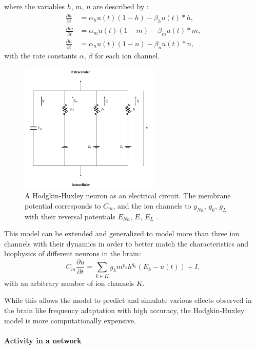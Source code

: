where the variables $h$, $m$, $n$  are described by :
\[
\begin{split}
	\frac{\partial h}{\partial t} &= \alpha_h u(t) (1-h) - \beta_h u(t) * h , \\
	\frac{\partial m}{\partial t} &= \alpha_m u(t) (1-m) - \beta_m u(t) * m , \\
	\frac{\partial n}{\partial t} &= \alpha_n u(t) (1-n) - \beta_n u(t) * n ,
\end{split}
\]
with the rate constants $\alpha$, $\beta$ for each ion channel.

\begin{figure}
	\centering
    	\includegraphics[width=0.6\textwidth]{imgs/hode_hux.png} 
    \caption[A Hodgkin-Huxley neuron as an electrical circuit.]{A Hodgkin-Huxley neuron as an electrical circuit. The membrane potential corresponds to $C_m$, and the ion channels to $g_{Na}$, $g_{k}$, $g_{L}$ with their reversal potentials $E_{Na}$, $E_{}$, $E_{L}$ \cite{heikoMA}.}
	\label{fig:hogdehux}
\end{figure}

This model can be extended and generalized to model more than three ion channels with their dynamics in order to better match the characteristics and biophysics of different neurons in the brain:
\[
C_m \frac{\partial u}{\partial t} = \sum_{k \in K} g_k m^{p_k} h^{q_k} (E_k - u(t)) + I,
\]
with an arbitrary number of ion channels $K$.

While this allows the model to predict and simulate various effects observed in the brain like frequency adaptation with high accuracy, the Hodgkin-Huxley model is more computationally expensive.

\paragraph{Activity in a network} \label{c:poissonspikes}

